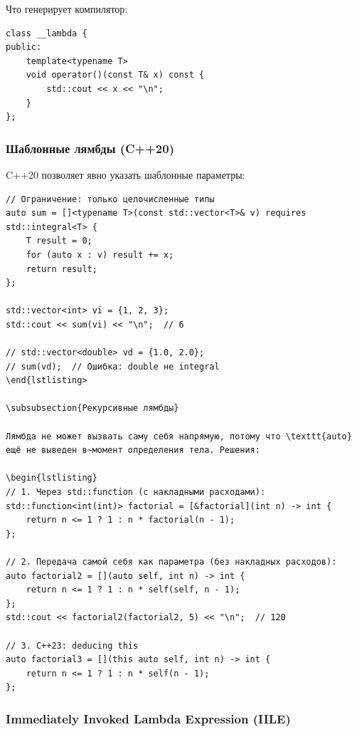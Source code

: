 \documentclass[a4paper,12pt]{article}
\begin{document}
Что генерирует компилятор:

\begin{lstlisting}
class __lambda {
public:
    template<typename T>
    void operator()(const T& x) const {
        std::cout << x << "\n";
    }
};
\end{lstlisting}

\subsubsection{Шаблонные лямбды (C++20)}

C++20 позволяет явно указать шаблонные параметры:

\begin{lstlisting}
// Ограничение: только целочисленные типы
auto sum = []<typename T>(const std::vector<T>& v) requires std::integral<T> {
    T result = 0;
    for (auto x : v) result += x;
    return result;
};

std::vector<int> vi = {1, 2, 3};
std::cout << sum(vi) << "\n";  // 6

// std::vector<double> vd = {1.0, 2.0};
// sum(vd);  // Ошибка: double не integral
\end{lstlisting>

\subsubsection{Рекурсивные лямбды}

Лямбда не может вызвать саму себя напрямую, потому что \texttt{auto}
ещё не выведен в~момент определения тела. Решения:

\begin{lstlisting}
// 1. Через std::function (с накладными расходами):
std::function<int(int)> factorial = [&factorial](int n) -> int {
    return n <= 1 ? 1 : n * factorial(n - 1);
};

// 2. Передача самой себя как параметра (без накладных расходов):
auto factorial2 = [](auto self, int n) -> int {
    return n <= 1 ? 1 : n * self(self, n - 1);
};
std::cout << factorial2(factorial2, 5) << "\n";  // 120

// 3. C++23: deducing this
auto factorial3 = [](this auto self, int n) -> int {
    return n <= 1 ? 1 : n * self(n - 1);
};
\end{lstlisting}

\subsubsection{Immediately Invoked Lambda Expression (IILE)}
\end{document}
